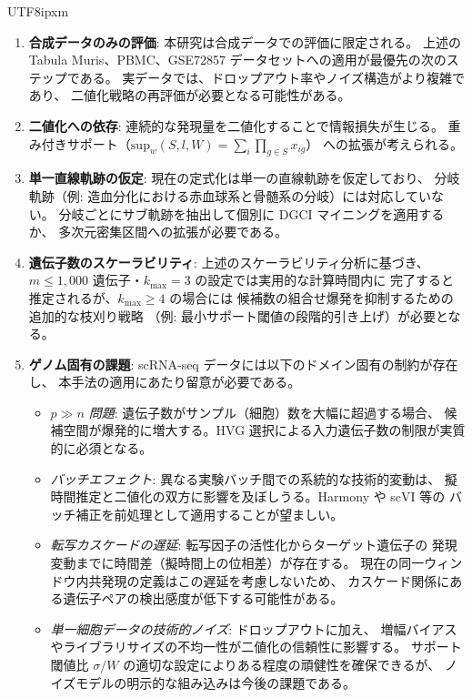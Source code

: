 \documentclass[11pt,a4paper]{article}
\begin{document}
\begin{CJK}{UTF8}{ipxm}
\begin{enumerate}
  \item \textbf{合成データのみの評価}: 本研究は合成データでの評価に限定される。
        上述の Tabula Muris、PBMC、GSE72857 データセットへの適用が最優先の次のステップである。
        実データでは、ドロップアウト率やノイズ構造がより複雑であり、
        二値化戦略の再評価が必要となる可能性がある。
  \item \textbf{二値化への依存}: 連続的な発現量を二値化することで情報損失が生じる。
        重み付きサポート（$\mathrm{sup}_w(S, l, W) = \sum_{i} \prod_{g \in S} x_{ig}$）
        への拡張が考えられる。
  \item \textbf{単一直線軌跡の仮定}: 現在の定式化は単一の直線軌跡を仮定しており、
        分岐軌跡（例: 造血分化における赤血球系と骨髄系の分岐）には対応していない。
        分岐ごとにサブ軌跡を抽出して個別に DGCI マイニングを適用するか、
        多次元密集区間への拡張が必要である。
  \item \textbf{遺伝子数のスケーラビリティ}: 上述のスケーラビリティ分析に基づき、
        $m \leq 1{,}000$ 遺伝子・$k_{\max} = 3$ の設定では実用的な計算時間内に
        完了すると推定されるが、$k_{\max} \geq 4$ の場合には
        候補数の組合せ爆発を抑制するための追加的な枝刈り戦略
        （例: 最小サポート閾値の段階的引き上げ）が必要となる。
  \item \textbf{ゲノム固有の課題}: scRNA-seq データには以下のドメイン固有の制約が存在し、
        本手法の適用にあたり留意が必要である。
        \begin{itemize}
          \item \textit{$p \gg n$ 問題}: 遺伝子数がサンプル（細胞）数を大幅に超過する場合、
                候補空間が爆発的に増大する。HVG 選択による入力遺伝子数の制限が実質的に必須となる。
          \item \textit{バッチエフェクト}: 異なる実験バッチ間での系統的な技術的変動は、
                擬時間推定と二値化の双方に影響を及ぼしうる。Harmony や scVI 等の
                バッチ補正を前処理として適用することが望ましい。
          \item \textit{転写カスケードの遅延}: 転写因子の活性化からターゲット遺伝子の
                発現変動までに時間差（擬時間上の位相差）が存在する。
                現在の同一ウィンドウ内共発現の定義はこの遅延を考慮しないため、
                カスケード関係にある遺伝子ペアの検出感度が低下する可能性がある。
          \item \textit{単一細胞データの技術的ノイズ}: ドロップアウトに加え、
                増幅バイアスやライブラリサイズの不均一性が二値化の信頼性に影響する。
                サポート閾値比 $\sigma/W$ の適切な設定によりある程度の頑健性を確保できるが、
                ノイズモデルの明示的な組み込みは今後の課題である。
        \end{itemize}
\end{enumerate}


\end{CJK}
\end{document}
